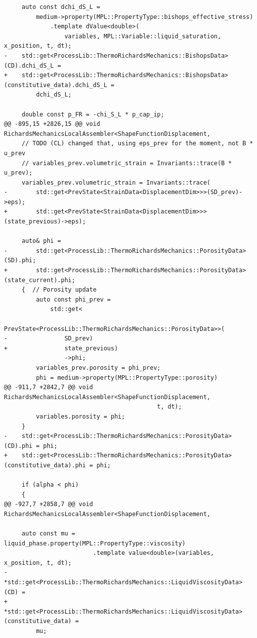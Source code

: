 \documentclass[10pt]{article}
\begin{document}
\begin{lstlisting}
     auto const dchi_dS_L =
         medium->property(MPL::PropertyType::bishops_effective_stress)
             .template dValue<double>(
                 variables, MPL::Variable::liquid_saturation, x_position, t, dt);
-    std::get<ProcessLib::ThermoRichardsMechanics::BishopsData>(CD).dchi_dS_L =
+    std::get<ProcessLib::ThermoRichardsMechanics::BishopsData>(constitutive_data).dchi_dS_L =
         dchi_dS_L;
 
     double const p_FR = -chi_S_L * p_cap_ip;
@@ -895,15 +2826,15 @@ void RichardsMechanicsLocalAssembler<ShapeFunctionDisplacement,
     // TODO (CL) changed that, using eps_prev for the moment, not B * u_prev
     // variables_prev.volumetric_strain = Invariants::trace(B * u_prev);
     variables_prev.volumetric_strain = Invariants::trace(
-        std::get<PrevState<StrainData<DisplacementDim>>>(SD_prev)->eps);
+        std::get<PrevState<StrainData<DisplacementDim>>>(state_previous)->eps);
 
     auto& phi =
-        std::get<ProcessLib::ThermoRichardsMechanics::PorosityData>(SD).phi;
+        std::get<ProcessLib::ThermoRichardsMechanics::PorosityData>(state_current).phi;
     {  // Porosity update
         auto const phi_prev =
             std::get<
                 PrevState<ProcessLib::ThermoRichardsMechanics::PorosityData>>(
-                SD_prev)
+                state_previous)
                 ->phi;
         variables_prev.porosity = phi_prev;
         phi = medium->property(MPL::PropertyType::porosity)
@@ -911,7 +2842,7 @@ void RichardsMechanicsLocalAssembler<ShapeFunctionDisplacement,
                                           t, dt);
         variables.porosity = phi;
     }
-    std::get<ProcessLib::ThermoRichardsMechanics::PorosityData>(CD).phi = phi;
+    std::get<ProcessLib::ThermoRichardsMechanics::PorosityData>(constitutive_data).phi = phi;
 
     if (alpha < phi)
     {
@@ -927,7 +2858,7 @@ void RichardsMechanicsLocalAssembler<ShapeFunctionDisplacement,
 
     auto const mu = liquid_phase.property(MPL::PropertyType::viscosity)
                         .template value<double>(variables, x_position, t, dt);
-    *std::get<ProcessLib::ThermoRichardsMechanics::LiquidViscosityData>(CD) =
+    *std::get<ProcessLib::ThermoRichardsMechanics::LiquidViscosityData>(constitutive_data) =
         mu;
 

\end{lstlisting}
\end{document}
